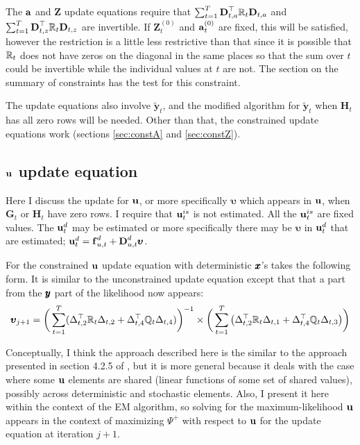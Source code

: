 \documentclass[]{article}
\def\uupsilon{\pmb{\upsilon}}
\def\XI{\mbox{\boldmath $\Xi$}}
\def\DD{\mbox{$\mathbf D$}}	\def\dd{\mbox{$\mathbf d$}}
\def\GG{\mbox{$\mathbf G$}}	\def\gg{\mbox{$\mathbf g$}}
\def\HH{\mbox{$\mathbf H$}}	\def\hh{\mbox{$\mathbf h$}}
\def\ZZ{\mbox{$\mathbf Z$}}	\def\zz{\mbox{$\mathbf z$}}	\def\Zb{\mbox{$\mathbf M$}} \def\Za{\mbox{$\mathbf N$}} \def\Zm{\XI}
\def\hatyt{\widetilde{\mbox{$\mathbf y$}}_t}
\begin{document}
The $\aa$ and $\ZZ$ update equations require that $\sum_{t=1}^T \DD_{t,a}^\top\Rm_t\DD_{t,a}$ and $\sum_{t=1}^T \DD_{t,z}^\top\Rm_t\DD_{t,z}$ are invertible.  If $\ZZ_t^{(0)}$ and $\aa_t^{(0)}$ are fixed, this will be satisfied, however the restriction is a little less restrictive than that since it is possible that $\Rm_t$ does not have zeros on the diagonal in the same places so that the sum over $t$ could be invertible while the individual values at $t$ are not.  The section on the summary of constraints has the test for this constraint.

The  update equations also
involve $\hatyt$, and the modified algorithm for $\hatyt$ when $\HH_t$ has all zero rows will be needed.  Other than that, the constrained update equations work (sections \ref{sec:constA} and \ref{sec:constZ}).  

\subsection{$\uu$ update equation}

Here I discuss the update for $\uu$, or more specifically $\uupsilon$ which appears in $\uu$, when $\GG_t$ or $\HH_t$ have zero rows.  I require that $\uu^{is}_t$ is not estimated.  All the $\uu^{is}_t$ are fixed values.  The $\uu_t^d$ may be estimated or more specifically there may be $\uupsilon$ in $\uu_t^d$ that are estimated;     $\uu_t^d = \ff_{u,t}^d+\DD_{u,t}^d\uupsilon$.


For the constrained $\uu$ update equation with deterministic $\xx$'s takes the following form.  It is similar to the unconstrained update equation except that that a part from the $\yy$ part of the likelihood now appears:
\begin{equation}
\begin{split}\label{eq:u.update.degen.2}
\pmb{\upsilon}_{j+1} = \bigg(\sum_{t=1}^T(\Delta_{t,2}^\top\Rm_t\Delta_{t,2} + \Delta_{t,4}^\top\Qm_t\Delta_{t,4})\bigg)^{-1} \times
 \bigg( \sum_{t=1}^T \big( \Delta_{t,2}^\top\Rm_t\Delta_{t,1} + \Delta_{t,4}^\top\Qm_t\Delta_{t,3} \big)  \bigg)\\
\end{split}
\end{equation}

Conceptually, I think the approach described here is the similar to the approach presented in section 4.2.5 of \citep{Harvey1989}, but it is more general because it deals with the case where some $\uu$ elements are shared (linear functions of some set of shared values), possibly across deterministic and stochastic elements.  Also, I present it here within the context of the EM algorithm, so solving for the maximum-likelihood $\uu$ appears in the context of maximizing $\Psi^+$ with respect to $\uu$ for the update equation at iteration $j+1$.
\end{document}
